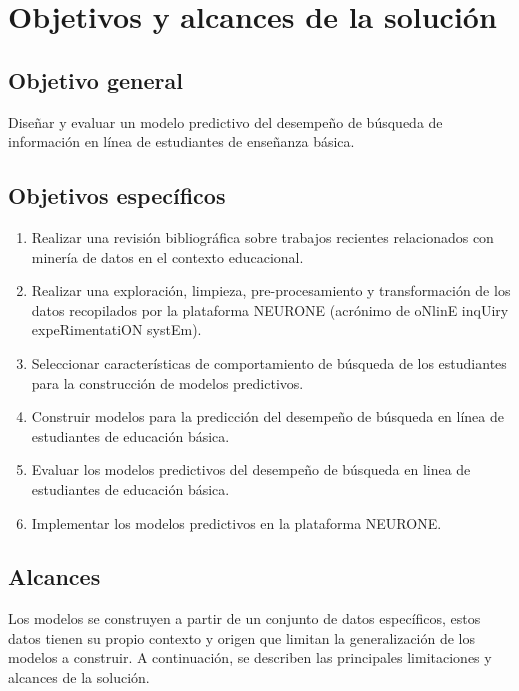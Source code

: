 \section{Objetivos y alcances de la solución}
\label{sec:objetivos}

\subsection{Objetivo general}
\label{subsec:objetivo-general}
Diseñar y evaluar un modelo predictivo del desempeño de búsqueda de información en línea de estudiantes de enseñanza básica.

\subsection{Objetivos específicos}
\label{subsec:objetivo-especificos}

\begin{enumerate}
	\item Realizar una revisión bibliográfica sobre trabajos recientes relacionados con minería de datos en el contexto educacional.
	\item Realizar una exploración, limpieza, pre-procesamiento y transformación de los datos recopilados por la plataforma NEURONE (acrónimo de oNlinE inqUiry expeRimentatiON systEm).
	\item Seleccionar características de comportamiento de búsqueda de los estudiantes para la construcción de modelos predictivos.
	\item Construir modelos para la predicción del desempeño de búsqueda en línea de estudiantes de educación básica.
	\item Evaluar los modelos predictivos del desempeño de búsqueda en linea de estudiantes de educación básica.
	\item Implementar los modelos predictivos en la plataforma NEURONE.
\end{enumerate}

\subsection{Alcances}
\label{subsec:alcances}
Los modelos se construyen a partir de un conjunto de datos específicos, estos datos tienen su propio contexto y origen que limitan la generalización de los modelos a construir. A continuación, se describen las principales limitaciones y alcances de la solución.

